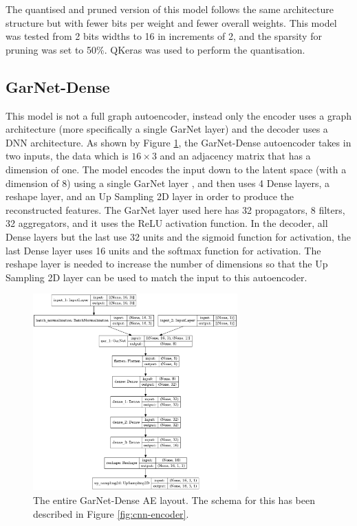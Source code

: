\documentclass[a4paper]{article}
\theoremstyle{plain}
\theoremstyle{definition}
\begin{document}
			The quantised and pruned version of this model follows the same architecture structure but with fewer bits per weight and fewer overall weights. This model was tested from 2 bits widths to 16 in increments of 2, and the sparsity for pruning was set to 50\%. QKeras \cite{qkeras} was used to perform the quantisation. 

		\subsection{GarNet-Dense}

			This model is not a full graph autoencoder, instead only the encoder uses a graph architecture (more specifically a single GarNet layer) and the decoder uses a DNN architecture. As shown by Figure \ref{fig:garnet-model}, the GarNet-Dense autoencoder takes in two inputs, the data which is $16 \times 3$ and an adjacency matrix that has a dimension of one. The model encodes the input down to the latent space (with a dimension of 8) using a single GarNet layer \cite{garnet}, and then uses 4 Dense layers, a reshape layer, and an Up Sampling 2D layer in order to produce the reconstructed features. The GarNet layer used here has 32 propagators, 8 filters, 32 aggregators, and it uses the ReLU activation function. In the decoder, all Dense layers but the last use 32 units and the sigmoid function for activation, the last Dense layer uses 16 units and the softmax function for activation. The reshape layer is needed to increase the number of dimensions so that the Up Sampling 2D layer can be used to match the input to this autoencoder. 
				
			\begin{figure}[H]
				\centering
				\begin{minipage}[b]{\linewidth}
					\centering
					\includegraphics[width=0.7\textwidth]{model.png}
					\caption{The entire GarNet-Dense AE layout. The schema for this has been described in Figure \ref{fig:cnn-encoder}.}
					\label{fig:garnet-model}
				\end{minipage}
			\end{figure}
\end{document}
